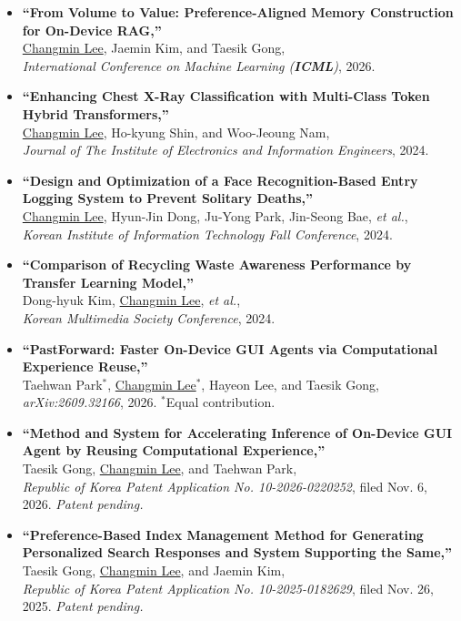 \documentclass[11pt, a4paper]{awesome-cv}
\newcommand{\me}{\underline{Changmin Lee}}
\newcommand{\pubtitle}[1]{{\color{darktext}\textbf{``#1,''}}}
\newenvironment{cvlist}[1][1.5mm]{%
  \begin{cvparagraph}
  \begin{itemize}[leftmargin=2ex, topsep=0pt, partopsep=0pt, parsep=0pt, itemsep=#1]
  \renewcommand{\labelitemi}{\bullet}%
}{%
  \end{itemize}
  \end{cvparagraph}
}
\begin{document}
\begin{cvlist}[2.5mm]
  \item {\pubtitle{From Volume to Value: Preference-Aligned Memory Construction for On-Device RAG} \\
    \me, Jaemin Kim, and Taesik Gong, \\
    \textit{International Conference on Machine Learning (\textbf{ICML})}, 2026.}
  \item {\pubtitle{Enhancing Chest X-Ray Classification with Multi-Class Token Hybrid Transformers} \\
    \me, Ho-kyung Shin, and Woo-Jeoung Nam, \\
    \textit{Journal of The Institute of Electronics and Information Engineers}, 2024.}
  \item {\pubtitle{Design and Optimization of a Face Recognition-Based Entry Logging System to Prevent Solitary Deaths} \\
    \me, Hyun-Jin Dong, Ju-Yong Park, Jin-Seong Bae, \textit{et al.}, \\
    \textit{Korean Institute of Information Technology Fall Conference}, 2024.}
  \item {\pubtitle{Comparison of Recycling Waste Awareness Performance by Transfer Learning Model} \\
    Dong-hyuk Kim, \me, \textit{et al.}, \\
    \textit{Korean Multimedia Society Conference}, 2024.}
\end{cvlist}

\begin{cvlist}[2.5mm]
  \item {\pubtitle{PastForward: Faster On-Device GUI Agents via Computational Experience Reuse} \\
    Taehwan Park$^{*}$, \me$^{*}$, Hayeon Lee, and Taesik Gong, \\
    \textit{arXiv:2609.32166}, 2026. $^{*}$Equal contribution.}
\end{cvlist}

\begin{cvlist}[2.5mm]
  \item {\pubtitle{Method and System for Accelerating Inference of On-Device GUI Agent by Reusing Computational Experience} \\
    Taesik Gong, \me, and Taehwan Park, \\
    \textit{Republic of Korea Patent Application No. 10-2026-0220252}, filed Nov. 6, 2026. \textit{Patent pending.}}
  \item {\pubtitle{Preference-Based Index Management Method for Generating Personalized Search Responses and System Supporting the Same} \\
    Taesik Gong, \me, and Jaemin Kim, \\
    \textit{Republic of Korea Patent Application No. 10-2025-0182629}, filed Nov. 26, 2025. \textit{Patent pending.}}
\end{cvlist}
\end{document}
